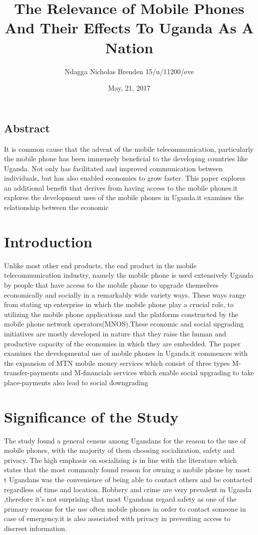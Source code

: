 \documentclass[12]{article}
\begin{document}
\title{The Relevance of Mobile Phones And Their Effects To Uganda As A Nation}
\author{Ndagga Nicholas Brenden 15/u/11200/eve}
\date{May, 21, 2017}
\maketitle

\newpage


\subsection{Abstract}
It is common cause that the advent of the mobile telecommunication, particularly the mobile phone has been immensely beneficial to the developing countries like Uganda. Not only has facilitated and improved communication between individuals, but has also enabled economies to grow faster. This paper explores an additional benefit that derives from having access to the mobile phones.it explores the development uses of the mobile phones in Uganda.it examines the relationship between the economic 

\section{Introduction}
	Unlike most other end products, the end product in the mobile telecommunication industry, namely the mobile phone is used extensively  Uganda by people that have access to the mobile phone to upgrade themselves economically  and socially in a remarkably wide variety ways. These  ways range from stating up enterprise in which the mobile phone play a crucial role, to utilizing the mobile phone applications and the platforms constructed by the mobile phone network operators(MNOS).These economic and social upgrading initiatives are mostly developed in nature that they raise the human and productive capacity of the economies in which they are embedded.
	The paper examines the developmental use of mobile phones in Uganda.it commences with the expansion of MTN mobile money services which consist of three types M-transfer-payments and  M-financials services which enable social upgrading to take place-payments also lead to social downgrading


\section{ Significance of the Study}
	The study found a general census among Ugandans for the reason to the use of mobile phones, with the majority of them choosing socialization, safety and privacy. The high emphasis on socializing is in line with the literature which states that the most commonly found reason for owning a mobile phone by most t Ugandans was the convenience of being able to contact others and be contacted regardless of time and location. Robbery and crime are very prevalent in Uganda ,therefore it’s not surprising that most Ugandans regard safety as one of the primary reasons for the use often mobile phones in order to contact someone in case of emergency.it is also associated with privacy in preventing access to discreet information.
\end{document}
